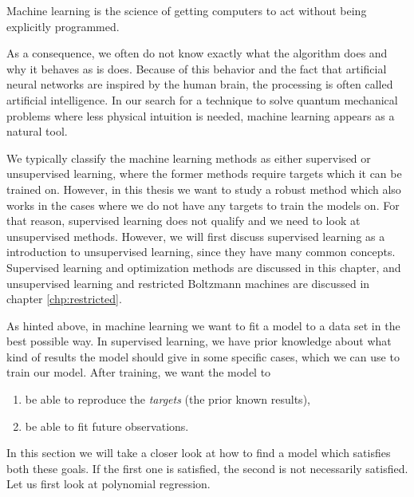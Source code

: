 \begin{shadequote}{}
	Machine learning is the science of getting computers to act without being explicitly programmed.
\end{shadequote}

As a consequence, we often do not know exactly what the algorithm does and why it behaves as is does. Because of this behavior and the fact that artificial neural networks are inspired by the human brain, the processing is often called artificial intelligence. In our search for a technique to solve quantum mechanical problems where less physical intuition is needed, machine learning appears as a natural tool.

We typically classify the machine learning methods as either supervised or unsupervised learning, where the former methods require targets which it can be trained on. However, in this thesis we want to study a robust method which also works in the cases where we do not have any targets to train the models on. For that reason, supervised learning does not qualify and we need to look at unsupervised methods. However, we will first discuss supervised learning as a introduction to unsupervised learning, since they have many common concepts. Supervised learning and optimization methods are discussed in this chapter, and unsupervised learning and restricted Boltzmann machines are discussed in chapter \ref{chp:restricted}.

As hinted above, in machine learning we want to fit a model to a data set in the best possible way. In supervised learning, we have prior knowledge about what kind of results the model should give in some specific cases, which we can use to train our model. After training, we want the model to
\begin{enumerate}
	\item be able to reproduce the \textit{targets} (the prior known results),
	\item be able to fit future observations.
\end{enumerate}
In this section we will take a closer look at how to find a model which satisfies both these goals. If the first one is satisfied, the second is not necessarily satisfied. Let us first look at polynomial regression. 

